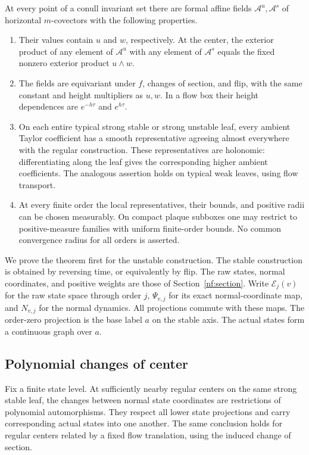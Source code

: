 \begin{theorem}\label{hull:main}
At every point of a conull invariant set there are formal affine fields
$\mathcal A^u,\mathcal A^s$ of horizontal $m$-covectors with the following
properties.
\begin{enumerate}[label=\textup{(\roman*)}]
\item Their values contain $u$ and $w$, respectively. At the center,
the exterior product of any element of $\mathcal A^u$ with any element of
$\mathcal A^s$ equals the fixed nonzero exterior product $u\wedge w$.
\item The fields are equivariant under $f$, changes of section, and flip,
with the same constant and height multipliers as $u,w$. In a flow box
their height dependences are $e^{-h\tau}$ and $e^{h\tau}$.
\item On each entire typical strong stable or strong unstable leaf,
every ambient Taylor coefficient has a smooth representative agreeing
almost everywhere with the regular construction. These representatives
are holonomic: differentiating along the leaf gives the corresponding
higher ambient coefficients. The analogous assertion holds on typical
weak leaves, using flow transport.
\item At every finite order the local representatives, their bounds,
and positive radii can be chosen measurably. On compact plaque subboxes
one may restrict to positive-measure families with uniform finite-order
bounds. No common convergence radius for all orders is asserted.
\end{enumerate}
\end{theorem}

We prove the theorem first for the unstable construction. The stable
construction is obtained by reversing time, or equivalently by flip.
The raw states, normal coordinates, and positive weights are those of
Section~\ref{nf:section}. Write $\mathcal E_j(v)$ for the raw state space
through order $j$, $\Psi_{v,j}$ for its exact normal-coordinate map,
and $N_{v,j}$ for the normal dynamics. All projections commute with these
maps. The order-zero projection is the base label $a$ on the stable axis.
The actual states form a continuous graph over $a$.

\subsection{Polynomial changes of center}

\begin{lemma}\label{hull:recenter}
Fix a finite state level. At sufficiently nearby regular centers on the
same strong stable leaf, the changes between normal state coordinates
are restrictions of polynomial automorphisms. They respect all lower
state projections and carry corresponding actual states into one another.
The same conclusion holds for regular centers related by a fixed flow
translation, using the induced change of section.
\end{lemma}

